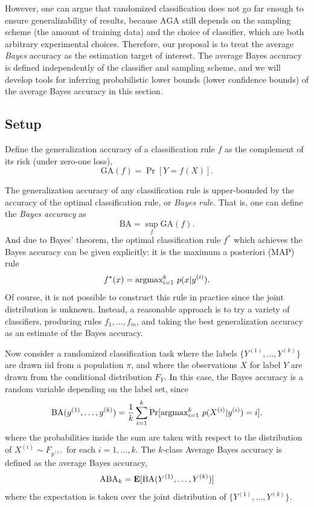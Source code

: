 However, one can argue that randomized classification does not go far
enough to ensure generalizability of results, because $\text{AGA}$
still depends on the sampling scheme (the amount of training data) and
the choice of classifier, which are both arbitrary experimental
choices.  Therefore, our proposal is to treat the average \emph{Bayes}
accuracy as the estimation target of interest.  The average Bayes
accuracy is defined independently of the classifier and sampling
scheme, and we will develop tools for inferring probabilistic lower
bounds (lower confidence bounds) of the average Bayes accuracy in this
section.

\subsection{Setup}


Define the generalization accuracy of a classification rule $f$ as the complement
of its risk (under zero-one loss),
\[
\text{GA}(f) = \Pr[Y = f(X)].
\]

The generalization accuracy of any classification rule is
upper-bounded by the accuracy of the optimal classification rule, or
\emph{Bayes rule.}  That is, one can define the \emph{Bayes accuracy}
as
\[
\text{BA} = \sup_f \text{GA}(f).
\]
And due to Bayes' theorem, the optimal classification rule $f^*$ which
achieves the Bayes accuracy can be given explicitly: it is the maximum a
posteriori (MAP) rule
\[
f^*(x) = \text{argmax}_{i=1}^k\ p(x|y^{(i)}).
\]
Of course, it is not possible to construct this rule in practice since
the joint distribution is unknown.  Instead, a reasonable approach is
to try a variety of classifiers, producing rules $f_1,\hdots, f_m$,
and taking the best generalization accuracy as an estimate of the Bayes
accuracy. 

Now consider a randomized classification task where the labels
$\{Y^{(1)},\hdots, Y^{(k)}\}$ are drawn iid from a population $\pi$,
and where the observations $X$ for label $Y$ are drawn from the
conditional distribution $F_Y$.  In this case, the Bayes accuracy is a
random variable depending on the label set, since
\[
\text{BA}(y^{(1)},\hdots, y^{(k)}) = \frac{1}{k} \sum_{i=1}^k \Pr[\argmax_{i=1}^k\ p(X^{(i)}|y^{(i)}) = i].
\]
where the probabilities inside the sum are taken with respect to the distribution of $X^{(i)} \sim F_{y^{(i)}}$ for each $i = 1,\hdots, k$.
The $k$-class Average Bayes accuracy is defined as the average Bayes accuracy,
\[
\text{ABA}_k = \textbf{E}[\text{BA}(Y^{(1)},\hdots, Y^{(k)})]
\]
where the expectation is taken over the joint distribution of $\{Y^{(1)},\hdots, Y^{(k)}\}$.

